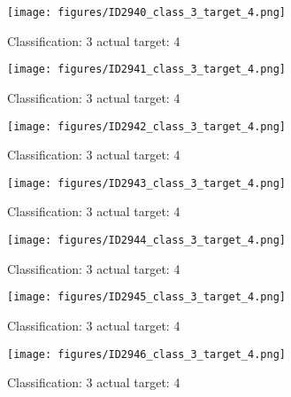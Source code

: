 \begin{figure}[h!]
\begin{center}
\texttt{[image: figures/ID2940\_class\_3\_target\_4.png]}
\end{center}
\caption{ Classification: 3 actual target: 4}
\label{fig:ID2940_class_3_target_4}
\end{figure}
\begin{figure}[h!]
\begin{center}
\texttt{[image: figures/ID2941\_class\_3\_target\_4.png]}
\end{center}
\caption{ Classification: 3 actual target: 4}
\label{fig:ID2941_class_3_target_4}
\end{figure}
\begin{figure}[h!]
\begin{center}
\texttt{[image: figures/ID2942\_class\_3\_target\_4.png]}
\end{center}
\caption{ Classification: 3 actual target: 4}
\label{fig:ID2942_class_3_target_4}
\end{figure}
\begin{figure}[h!]
\begin{center}
\texttt{[image: figures/ID2943\_class\_3\_target\_4.png]}
\end{center}
\caption{ Classification: 3 actual target: 4}
\label{fig:ID2943_class_3_target_4}
\end{figure}
\begin{figure}[h!]
\begin{center}
\texttt{[image: figures/ID2944\_class\_3\_target\_4.png]}
\end{center}
\caption{ Classification: 3 actual target: 4}
\label{fig:ID2944_class_3_target_4}
\end{figure}
\begin{figure}[h!]
\begin{center}
\texttt{[image: figures/ID2945\_class\_3\_target\_4.png]}
\end{center}
\caption{ Classification: 3 actual target: 4}
\label{fig:ID2945_class_3_target_4}
\end{figure}
\begin{figure}[h!]
\begin{center}
\texttt{[image: figures/ID2946\_class\_3\_target\_4.png]}
\end{center}
\caption{ Classification: 3 actual target: 4}
\label{fig:ID2946_class_3_target_4}
\end{figure}
